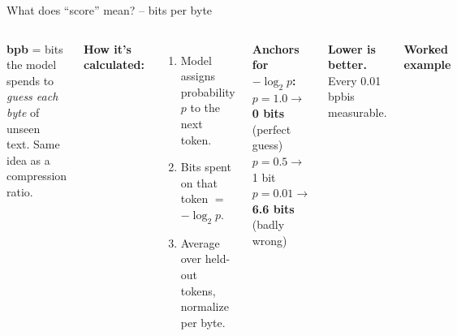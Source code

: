 \documentclass[aspectratio=169,10pt]{beamer}
\newcommand{\good}[1]{\textcolor{ok}{\textbf{#1}}}
\newcommand{\bad}[1]{\textcolor{accent}{\textbf{#1}}}
\newcommand{\hil}[1]{\textcolor{primary}{\textbf{#1}}}
\newcommand{\bpb}{\,bpb}
\begin{document}
\begin{frame}{What does ``score'' mean? -- bits per byte}
\begin{columns}[T,onlytextwidth]
\small
\textbf{bpb} = bits the model spends to \emph{guess each byte} of unseen text.
Same idea as a compression ratio.

\vspace{0.5em}
\textbf{How it's calculated:}
\begin{enumerate}\setlength{\itemsep}{1pt}
  \item Model assigns probability $p$ to the next token.
  \item Bits spent on that token $=$ \hil{$-\log_2 p$}.
  \item Average over held-out tokens, normalize per byte.
\end{enumerate}

\vspace{0.5em}
{\footnotesize \textbf{Anchors for $-\log_2 p$:} \\
\hspace*{0.5em}$p{=}1.0 \to $ \good{0 bits} (perfect guess) \\
\hspace*{0.5em}$p{=}0.5 \to $ 1 bit \\
\hspace*{0.5em}$p{=}0.01 \to $ \bad{6.6 bits} (badly wrong)}

\vspace{0.5em}
\textcolor{accent}{\textbf{Lower is better.}} Every 0.01\bpb is measurable.

\centering
\textbf{\small Worked example}
\vspace{0.2em}


\end{columns}
\end{frame}
\end{document}

